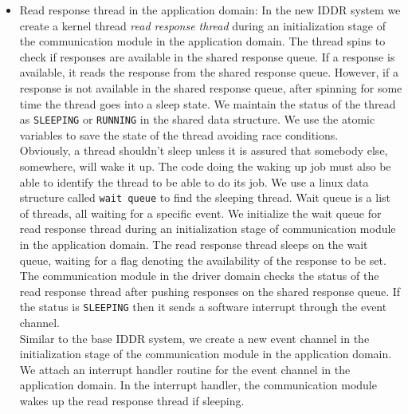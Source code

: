 \begin{itemize}
\item Read response thread in the application domain: 
In the new IDDR system we create a kernel thread \textit{read response thread} during an initialization stage of the communication module in the application domain. The thread spins to check if responses are available in the shared response queue. If a response is available, it reads the response from the shared response queue. However, if a response is not available in the shared response queue, after spinning for some time the thread goes into a sleep state. We maintain the status of the thread as \texttt{SLEEPING} or \texttt{RUNNING} in the shared data structure. We use the atomic variables to save the state of the thread avoiding race conditions. 
\\[3mm]
Obviously, a thread shouldn't sleep unless it is assured that somebody else, somewhere, will wake it up. The code doing the waking up job must also be able to identify the thread to be able to do its job. We use a linux data structure called \texttt{wait queue} to find the sleeping thread. Wait queue is a list of threads, all waiting for a specific event\cite{galvin, Bovet:2005:ULK:1077084}. We initialize the wait queue for read response thread during an initialization stage of communication module in the application domain. The read response thread sleeps on the wait queue, waiting for a flag denoting the availability of the response to be set. The communication module in the driver domain checks the status of the read response thread after pushing responses on the shared response queue. If the status is \texttt{SLEEPING} then it sends a software interrupt through the event channel.
\\[3mm]
Similar to the base IDDR system, we create a new event channel in the initialization stage of the communication module in the application domain. We attach an interrupt handler routine for the event channel in the application domain. In the interrupt handler, the communication module wakes up the read response thread if sleeping. 


\end{itemize}
